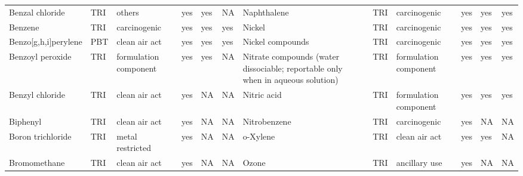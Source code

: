 \begin{table}[H]
{\begin{tabular}{llllllllllll}
            Benzal chloride                                                            & TRI            & others                & yes    & yes     & NA   & Naphthalene                                                                                                        & TRI            & carcinogenic          & yes    & yes     & yes  \\
            Benzene                                                                    & TRI            & carcinogenic          & yes    & yes     & yes  & Nickel                                                                                                             & TRI            & carcinogenic          & yes    & yes     & yes  \\
            Benzo[g,h,i]perylene                                                       & PBT            & clean air act         & yes    & yes     & yes  & Nickel compounds                                                                                                   & TRI            & carcinogenic & yes & yes & yes\\
            Benzoyl peroxide                                                           & TRI            & formulation component & yes    & yes     & NA   & Nitrate compounds (water dissociable; reportable only when in aqueous solution) & TRI & formulation component & yes & yes & yes\\
            Benzyl chloride                                                            & TRI            & clean air act         & yes    & NA      & NA   & Nitric acid                                                                                                        & TRI            & formulation component & yes & yes & yes\\
            Biphenyl                                                                   & TRI            & clean air act         & yes    & NA      & NA   & Nitrobenzene                                                                                                       & TRI            & carcinogenic          & yes    & NA      & NA   \\
            Boron trichloride                                                          & TRI            & metal restricted      & yes    & NA      & NA   & o-Xylene                                                                                                           & TRI            & clean air act         & yes    & yes & NA\\
            Bromomethane                                                               & TRI            & clean air act         & yes    & NA      & NA   & Ozone                                                                                                              & TRI            & ancillary use         & yes    & NA      & NA   \\

\end{tabular}}
\end{table}
